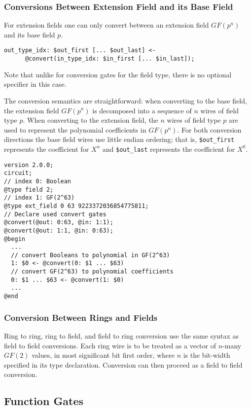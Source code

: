 \subsubsection{Conversions Between Extension Field and its Base Field}

For extension fields one can only convert between an extension field $GF(p^n)$ and its base field $p$.
\begin{lstlisting}[language=ir]
  out_type_idx: $out_first [... $out_last] <-
      @convert(in_type_idx: $in_first [... $in_last]);
\end{lstlisting}
Note that unlike for conversion gates for the field type, there is no optional
specifier in this case.

The conversion semantics are straightforward: when converting to the base field,
the extension field $GF(p^n)$ is decomposed into a sequence of $n$ wires of
field type $p$. When converting to the extension field, the $n$ wires of field
type $p$ are used to represent the polynomial coefficients in $GF(p^n)$. For
both conversion directions the base field wires use little endian ordering; that
is, \texttt{\$out\_first} represents the coefficient for $X^n$ and
\texttt{\$out\_last} represents the coefficient for $X^0$.

\begin{lstlisting}[language=ir]
version 2.0.0;
circuit;
// index 0: Boolean
@type field 2;
// index 1: GF(2^63)
@type ext_field 0 63 9223372036854775811;
// Declare used convert gates
@convert(@out: 0:63, @in: 1:1);
@convert(@out: 1:1, @in: 0:63);
@begin
  ...
  // convert Booleans to polynomial in GF(2^63)
  1: $0 <- @convert(0: $1 ... $63)
  // convert GF(2^63) to polynomial coefficients
  0: $1 ... $63 <- @convert(1: $0)
  ...
@end
\end{lstlisting}

\subsubsection{Conversion Between Rings and Fields}
Ring to ring, ring to field, and field to ring conversion use the same syntax as field to field conversions.
Each ring wire is to be treated as a vector of $n$-many $GF(2)$ values, in most significant bit first order, where $n$ is the bit-width specified in its type declaration.
Conversion can then proceed as a field to field conversion.

\subsection{Function Gates}

